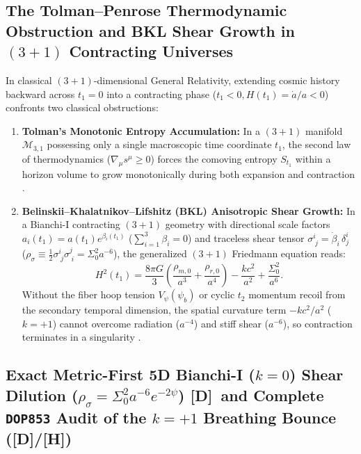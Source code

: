 \documentclass[11pt,a4paper]{article}
\newcommand{\catD}{\textbf{\textcolor{blue!75!black}{[D]}}}
\newcommand{\catH}{\textbf{\textcolor{orange!85!black}{[H]}}}
\theoremstyle{plain}
\theoremstyle{definition}
\theoremstyle{remark}
\numberwithin{equation}{section}
\begin{document}
\subsection{\texorpdfstring{The Tolman--Penrose Thermodynamic Obstruction and BKL Shear Growth in $(3+1)$ Contracting Universes}{The Tolman-Penrose Thermodynamic Obstruction and BKL Shear Growth in (3+1) Contracting Universes}}

In classical $(3+1)$-dimensional General Relativity, extending cosmic history backward across $t_1 = 0$ into a contracting phase ($t_1 < 0, H(t_1) = \dot{a}/a < 0$) \cite{tolman1934,steinhardt2002,penrose2010} confronts two classical obstructions:
\begin{enumerate}
    \item \textbf{Tolman's Monotonic Entropy Accumulation:} In a $(3+1)$ manifold $\mathcal{M}_{3,1}$ possessing only a single macroscopic time coordinate $t_1$, the second law of thermodynamics ($\nabla_\mu s^\mu \ge 0$) forces the comoving entropy $S_{t_1}$ within a horizon volume to grow monotonically during both expansion and contraction \cite{tolman1934,penrose1979_weyl}.
    \item \textbf{Belinskii--Khalatnikov--Lifshitz (BKL) Anisotropic Shear Growth:} In a Bianchi-I contracting $(3+1)$ geometry with directional scale factors $a_i(t_1) = a(t_1)e^{\beta_i(t_1)}$ ($\sum_{i=1}^3 \beta_i = 0$) and traceless shear tensor $\sigma^i_{\;j} = \dot{\beta}_i\,\delta^i_j$ ($\rho_{\sigma} \equiv \frac{1}{2}\sigma^i_{\;j}\sigma^j_{\;i} = \Sigma_0^2 a^{-6}$), the generalized $(3+1)$ Friedmann equation reads:
    \begin{equation}
    H^2(t_1) = \frac{8\pi G}{3}\left( \frac{\rho_{m,0}}{a^3} + \frac{\rho_{r,0}}{a^4} \right) - \frac{k c^2}{a^2} + \frac{\Sigma_0^2}{a^6}.
    \label{eq:bkl_shear_friedmann}
    \end{equation}
    Without the fiber hoop tension $V_{\psi}(\psi_b)$ or cyclic $t_2$ momentum recoil from the secondary temporal dimension, the spatial curvature term $-k c^2/a^2$ ($k = +1$) cannot overcome radiation ($a^{-4}$) and stiff shear ($a^{-6}$), so contraction terminates in a singularity \cite{bkl1970}.
\end{enumerate}

\subsection{\texorpdfstring{Exact Metric-First 5D Bianchi-I ($k = 0$) Shear Dilution ($\rho_{\sigma} = \Sigma_0^2 a^{-6}e^{-2\psi}$) \catD\ and Complete \texttt{DOP853} Audit of the $k = +1$ Breathing Bounce (\catD/\catH)}{Exact Metric-First 5D Bianchi-I Shear Dilution and Complete DOP853 Audit of the k = +1 Breathing Bounce}}
\end{document}
